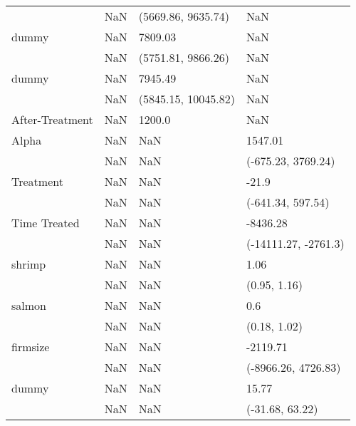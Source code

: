 \begin{tabular}{llll}
                &                     NaN &     (5669.86, 9635.74) &                   NaN \\
dummy           &                     NaN &                7809.03 &                   NaN \\
                &                     NaN &     (5751.81, 9866.26) &                   NaN \\
dummy           &                     NaN &                7945.49 &                   NaN \\
                &                     NaN &    (5845.15, 10045.82) &                   NaN \\
After-Treatment &                     NaN &                 1200.0 &                   NaN \\
Alpha           &                     NaN &                    NaN &               1547.01 \\
                &                     NaN &                    NaN &    (-675.23, 3769.24) \\
Treatment       &                     NaN &                    NaN &                 -21.9 \\
                &                     NaN &                    NaN &     (-641.34, 597.54) \\
Time Treated    &                     NaN &                    NaN &              -8436.28 \\
                &                     NaN &                    NaN &  (-14111.27, -2761.3) \\
shrimp          &                     NaN &                    NaN &                  1.06 \\
                &                     NaN &                    NaN &          (0.95, 1.16) \\
salmon          &                     NaN &                    NaN &                   0.6 \\
                &                     NaN &                    NaN &          (0.18, 1.02) \\
firmsize        &                     NaN &                    NaN &              -2119.71 \\
                &                     NaN &                    NaN &   (-8966.26, 4726.83) \\
dummy           &                     NaN &                    NaN &                 15.77 \\
                &                     NaN &                    NaN &       (-31.68, 63.22) \\

\end{tabular}
